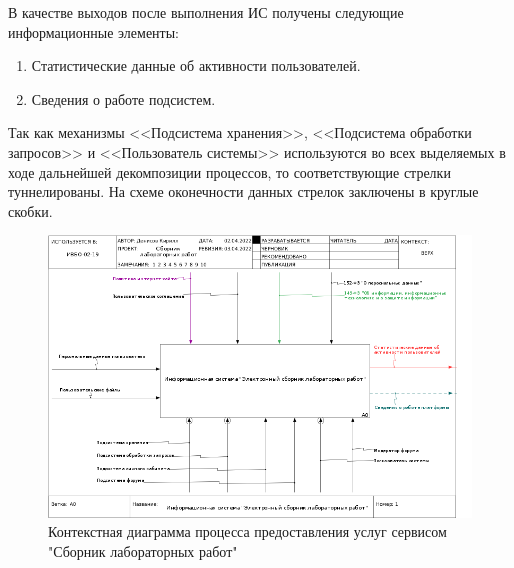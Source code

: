 \documentclass[a4paper,14pt]{extarticle}
\begin{document}
В качестве выходов после выполнения ИС получены следующие
информационные элементы:
\begin{enumerate}
	\item Статистические данные об активности пользователей.
	\item Сведения о работе подсистем.
\end{enumerate}

Так как механизмы <<Подсистема хранения>>, <<Подсистема обработки запросов>> и <<Пользователь системы>> 
используются во всех выделяемых в ходе дальнейшей декомпозиции процессов, то соответствующие стрелки туннелированы. На схеме оконечности данных стрелок заключены в круглые скобки.

\begin{figure}[h!]
	\centering
	\includegraphics[width=0.8\linewidth]{images/ramus/01_A0}
	\caption{Контекстная диаграмма процесса предоставления услуг сервисом "Сборник лабораторных работ"}
	\label{fig:01a0}
\end{figure}
\end{document}
